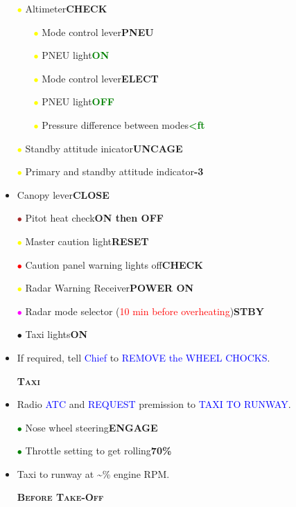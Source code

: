 \documentclass[a4paper,12pt,dvipsnames]{letter}
\newcommand{\rot}[1]{\textcolor{red}{#1}}
\newcommand{\radio}[1]{\textcolor{blue}{#1}}
\newcommand{\button}[1]{\textbf{#1}}
\newcommand{\ok}[1]{\textcolor{Green}{\textbf{#1}}}
\newcommand{\myHead}[1]{{\LARGE\textsc{\textbf{#1}}}}
\newcommand{\bi}{\textcolor{ProcessBlue}{$\bullet$\;}}
\newcommand{\ri}{\textcolor{Red}{$\bullet$\;}}
\newcommand{\gi}{\textcolor{Green}{$\bullet$\;}}
\newcommand{\yi}{\textcolor{Yellow}{$\bullet$\;}}
\newcommand{\mi}{\textcolor{Magenta}{$\bullet$\;}}
\renewcommand{\ni}{\textcolor{Brown}{$\bullet$\;}}
\begin{document}
{\begin{itemize}
 \item[\yi] Altimeter\dotfill\button{CHECK}
 \begin{itemize}
 \item[\yi] Mode control lever\dotfill\button{PNEU}
 \item[\yi] PNEU light\dotfill\ok{ON}
 \item[\yi] Mode control lever\dotfill\button{ELECT}
 \item[\yi] PNEU light\dotfill\ok{OFF}
 \item[\yi] Pressure difference between modes\dotfill\ok{<\;ft}
 \end{itemize}
 \item[\yi] Standby attitude inicator\dotfill\button{UNCAGE}
 \item[\yi] Primary and standby attitude indicator\dotfill\button{-3\textdegree{}}
 \item Canopy lever\dotfill\button{CLOSE}
 \item[\ni] Pitot heat check\dotfill\button{ON then OFF}
 \item[\yi] Master caution light\dotfill\button{RESET}
 \item[\ri] Caution panel warning lights off\dotfill\button{CHECK}
 \item[\yi] Radar Warning Receiver\dotfill\button{POWER ON}
 \item[\mi] Radar mode selector (\rot{10 min before overheating})\dotfill\button{STBY}
 \item[\bi] Taxi lights\dotfill\button{ON}
 \item If required, tell \radio{Chief} to \radio{REMOVE the WHEEL CHOCKS}.
\end{itemize}
\newpage
\begin{itemize}
 \item[] \myHead{Taxi}
 \item Radio \radio{ATC} and \radio{REQUEST} premission to \radio{TAXI TO RUNWAY}.
 \item[\gi] Nose wheel steering\dotfill\button{ENGAGE}
 \item[\gi] Throttle setting to get rolling\dotfill\button{70\;\%}
 \item Taxi to runway at \textasciitilde{}\;\% engine RPM.
\end{itemize}
\begin{itemize}
 \item[] \myHead{Before Take-Off}

\end{itemize}}
\end{document}
